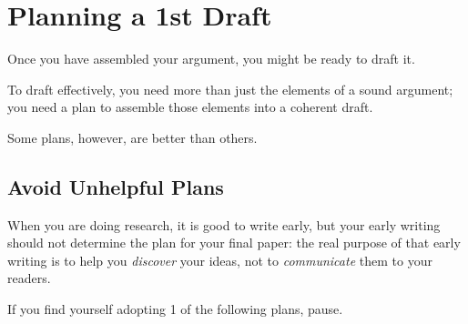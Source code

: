 \documentclass[oneside]{book}
\numberwithin{equation}{section}
\begin{document}

\chapter{Planning a 1st Draft}

Once you have assembled your argument, you might be ready to draft it.


To draft effectively, you need more than just the elements of a sound argument; you need a plan to assemble those elements into a coherent draft.

Some plans, however, are better than others.

\section{Avoid Unhelpful Plans}
When you are doing research, it is good to write early, but your early writing should not determine the plan for your final paper: the real purpose of that early writing is to help you \textit{discover} your ideas, not to \textit{communicate} them to your readers.

If you find yourself adopting 1 of the following plans, pause.
\end{document}
